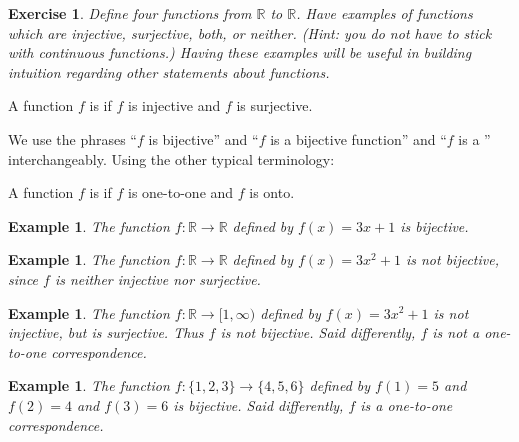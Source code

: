 \documentclass{book}
\newcounter{ekcounter}%
\theoremstyle{ekimcustom}
\newtheorem{example}[ekcounter]{Example}
\newtheorem{exercise}[ekcounter]{Exercise}
\newcommand\defn[1]{{\color{blue}{\bf #1}}}
\begin{document}
\begin{exercise}
Define four functions from $\mathbb{R}$ to $\mathbb{R}$. Have examples of functions which are injective, surjective, both, or neither. (Hint: you do not have to stick with continuous functions.) Having these examples will be useful in building intuition regarding other statements about functions.
\end{exercise}










\begin{bdefinition}{}{}
A function $f$ is \defn{bijective} if $f$ is injective and $f$ is surjective.
\end{bdefinition}
We use the phrases ``$f$ is bijective'' and ``$f$ is a bijective function'' and ``$f$ is a \defn{bijection}'' interchangeably. Using the other typical terminology:
\begin{bdefinition}{}{}
A function $f$ is \defn{one-to-one correspondence} if $f$ is one-to-one and $f$ is onto.
\end{bdefinition}


\begin{example}
The function $f : \mathbb{R} \to \mathbb{R}$ defined by $f(x)=3x+1$ is bijective.
\end{example}
\begin{example}
The function $f : \mathbb{R} \to \mathbb{R}$ defined by $f(x)=3x^2+1$ is not bijective, since $f$ is neither injective nor surjective.
\end{example}
\begin{example}
The function $f : \mathbb{R} \to [1,\infty)$ defined by $f(x)=3x^2+1$ is not injective, but is surjective. Thus $f$ is not bijective. Said differently, $f$ is not a one-to-one correspondence.
\end{example}
\begin{example}\label{example:discrete-bijective}
The function $f : \{1,2,3\} \to \{4,5,6\}$ defined by $f(1)=5$ and $f(2)=4$ and $f(3)=6$ is bijective. Said differently, $f$ is a one-to-one correspondence.
\end{example}
\end{document}
